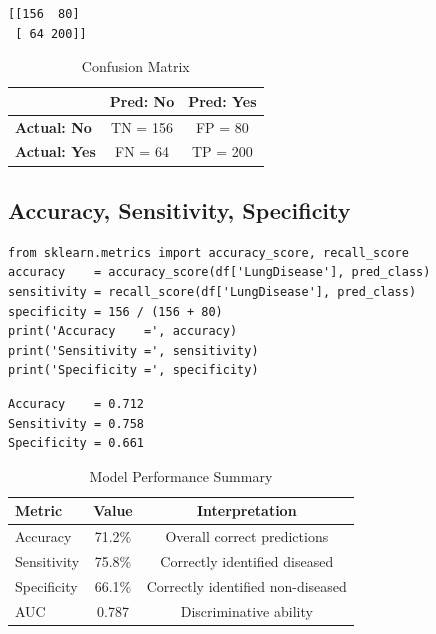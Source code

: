 \documentclass[12pt,a4paper]{article}
\begin{document}
\begin{lstlisting}[style=outputstyle]
[[156  80]
 [ 64 200]]
\end{lstlisting}

\begin{table}[H]
  \centering
  \caption{Confusion Matrix}
  \begin{tabular}{lcc}
    \toprule
    & \textbf{Pred: No} & \textbf{Pred: Yes} \\
    \midrule
    \textbf{Actual: No}  & TN = 156 & FP = 80 \\
    \textbf{Actual: Yes} & FN = 64  & TP = 200 \\
    \bottomrule
  \end{tabular}
\end{table}

\subsection{Accuracy, Sensitivity, Specificity}

\begin{lstlisting}[style=pythonstyle]
from sklearn.metrics import accuracy_score, recall_score
accuracy    = accuracy_score(df['LungDisease'], pred_class)
sensitivity = recall_score(df['LungDisease'], pred_class)
specificity = 156 / (156 + 80)
print('Accuracy    =', accuracy)
print('Sensitivity =', sensitivity)
print('Specificity =', specificity)
\end{lstlisting}

\begin{lstlisting}[style=outputstyle]
Accuracy    = 0.712
Sensitivity = 0.758
Specificity = 0.661
\end{lstlisting}

\begin{table}[H]
  \centering
  \caption{Model Performance Summary}
  \begin{tabular}{lcc}
    \toprule
    \textbf{Metric} & \textbf{Value} & \textbf{Interpretation} \\
    \midrule
    Accuracy    & 71.2\% & Overall correct predictions \\
    Sensitivity & 75.8\% & Correctly identified diseased \\
    Specificity & 66.1\% & Correctly identified non-diseased \\
    AUC         & 0.787  & Discriminative ability \\
    \bottomrule
  \end{tabular}
\end{table}
\end{document}
